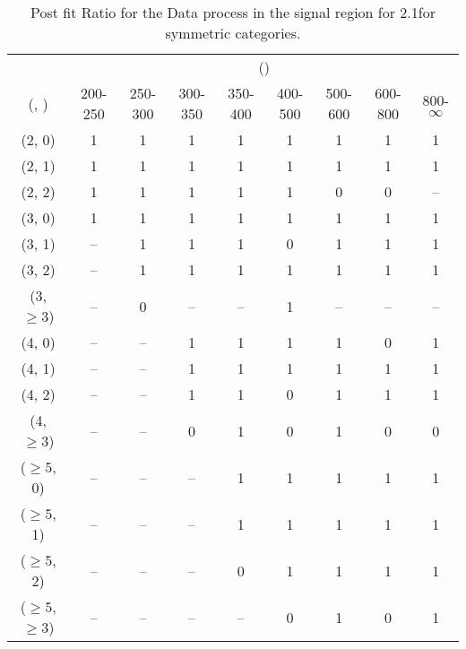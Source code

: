 \begin{table}[h!]
\tiny
\centering
\caption{Post fit Ratio for the Data process in the signal region for 2.1\ifb for symmetric categories.\label{tab:ratioseppost_sig_data_sym}}
\begin{tabular}
{ccccccccc}
	\hline\hline
	& \multicolumn{8}{c}{\scalht (\gev)} \\ 
	 (\njet,  \nb) & 200-250 & 250-300 & 300-350 & 350-400 & 400-500 & 500-600 & 600-800 & 800-$\infty$ \\ [0.8ex] 
\hline
	(2, 0) & 1 & 1 & 1 & 1 & 1 & 1 & 1 & 1 \\[0.5ex] 
	(2, 1) & 1 & 1 & 1 & 1 & 1 & 1 & 1 & 1 \\[0.5ex] 
	(2, 2) & 1 & 1 & 1 & 1 & 1 & 0 & 0 & -- \\[0.5ex] 
	(3, 0) & 1 & 1 & 1 & 1 & 1 & 1 & 1 & 1 \\[0.5ex] 
	(3, 1) & -- & 1 & 1 & 1 & 0 & 1 & 1 & 1 \\[0.5ex] 
	(3, 2) & -- & 1 & 1 & 1 & 1 & 1 & 1 & 1 \\[0.5ex] 
	(3, $\ge3$) & -- & 0 & -- & -- & 1 & -- & -- & -- \\[0.5ex] 
	(4, 0) & -- & -- & 1 & 1 & 1 & 1 & 0 & 1 \\[0.5ex] 
	(4, 1) & -- & -- & 1 & 1 & 1 & 1 & 1 & 1 \\[0.5ex] 
	(4, 2) & -- & -- & 1 & 1 & 0 & 1 & 1 & 1 \\[0.5ex] 
	(4, $\ge3$) & -- & -- & 0 & 1 & 0 & 1 & 0 & 0 \\[0.5ex] 
	($\ge5$, 0) & -- & -- & -- & 1 & 1 & 1 & 1 & 1 \\[0.5ex] 
	($\ge5$, 1) & -- & -- & -- & 1 & 1 & 1 & 1 & 1 \\[0.5ex] 
	($\ge5$, 2) & -- & -- & -- & 0 & 1 & 1 & 1 & 1 \\[0.5ex] 
	($\ge5$, $\ge3$) & -- & -- & -- & -- & 0 & 1 & 0 & 1 \\[0.5ex] 
	\hline
	\hline
\end{tabular}
\end{table}

